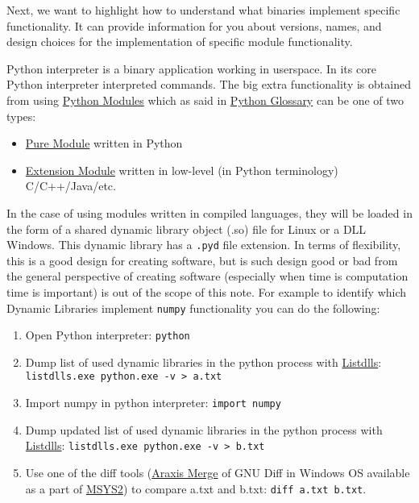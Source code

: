 \documentclass[
]{article}
\begin{document}
Next, we want to highlight how to understand what binaries implement
specific functionality. It can provide information for you about
versions, names, and design choices for the implementation of specific
module functionality.

Python interpreter is a binary application working in userspace. In its
core Python interpreter interpreted commands. The big extra
functionality is obtained from using
\href{https://packaging.python.org/en/latest/glossary/\#term-Module}{Python
Modules} which as said in
\href{https://packaging.python.org/en/latest/glossary/}{Python Glossary}
can be one of two types:

\begin{itemize}
\item
  \href{https://packaging.python.org/en/latest/glossary/\#term-Pure-Module}{Pure
  Module} written in Python
\item
  \href{https://packaging.python.org/en/latest/glossary/\#term-Extension-Module}{Extension
  Module} written in low-level (in Python terminology) C/C++/Java/etc.
\end{itemize}

In the case of using modules written in compiled languages, they will be
loaded in the form of a shared dynamic library object (.so) file for
Linux or a DLL Windows. This dynamic library has a \texttt{.pyd} file
extension. In terms of flexibility, this is a good design for creating
software, but is such design good or bad from the general perspective of
creating software (especially when time is computation time is
important) is out of the scope of this note. For example to identify
which Dynamic Libraries implement \texttt{numpy} functionality you can
do the following:

\begin{enumerate}
\def\labelenumi{\arabic{enumi}.}
\item
  Open Python interpreter: \texttt{python}
\item
  Dump list of used dynamic libraries in the python process with
  \href{https://learn.microsoft.com/en-us/sysinternals/downloads/listdlls}{Listdlls}:
  \texttt{listdlls.exe\ python.exe\ -v\ \textgreater{}\ a.txt}
\item
  Import numpy in python interpreter: \texttt{import\ numpy}
\item
  Dump updated list of used dynamic libraries in the python process with
  \href{https://learn.microsoft.com/en-us/sysinternals/downloads/listdlls}{Listdlls}:
  \texttt{listdlls.exe\ python.exe\ -v\ \textgreater{}\ b.txt}
\item
  Use one of the diff tools
  (\href{https://www.araxis.com/merge/index.en}{Araxis Merge} of GNU
  Diff in Windows OS available as a part of
  \href{https://www.msys2.org/}{MSYS2}) to compare a.txt and b.txt:
  \texttt{diff\ a.txt\ b.txt}.
\end{enumerate}
\end{document}
